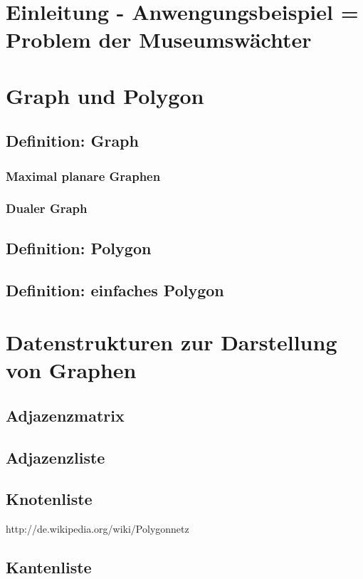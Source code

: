\documentclass[a4paper]{article}
\begin{document}
\setlength{\parindent}{0pt} 


\tableofcontents

\newpage

\section{Einleitung - Anwengungsbeispiel = Problem der Museumswächter}

\section{Graph und Polygon}
\subsection{Definition: Graph}
\subsubsection{Maximal planare Graphen}
\subsubsection{Dualer Graph}
\subsection{Definition: Polygon}
\subsection{Definition: einfaches Polygon}

\section{Datenstrukturen zur Darstellung von Graphen}
\subsection{Adjazenzmatrix}
\subsection{Adjazenzliste}
\subsection{Knotenliste}
http://de.wikipedia.org/wiki/Polygonnetz
\subsection{Kantenliste}
\end{document}
